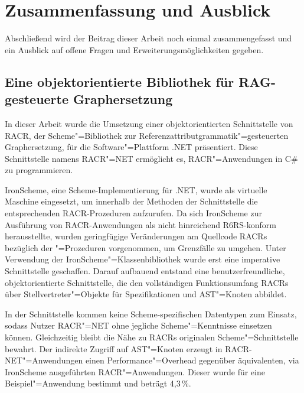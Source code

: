 

\chapter{Zusammenfassung und Ausblick}\label{ausblick}

Abschließend wird der Beitrag dieser Arbeit noch einmal zusammengefasst und ein Ausblick auf offene Fragen und Erweiterungsmöglichkeiten gegeben.

\section{Eine objektorientierte Bibliothek für RAG-gesteuerte Graphersetzung}

In dieser Arbeit wurde die Umsetzung einer objektorientierten Schnittstelle von RACR, der Scheme"=Bibliothek zur Referenzattributgrammatik"=gesteuerten Graphersetzung, für die Software"=Plattform .NET präsentiert. Diese Schnittstelle namens RACR"=NET ermöglicht es, RACR"=Anwendungen in C\# zu programmieren.

IronScheme, eine Scheme-Implementierung für .NET, wurde als virtuelle Maschine eingesetzt, um innerhalb der Methoden der Schnittstelle die entsprechenden RACR-Prozeduren aufzurufen. Da sich IronScheme zur Ausführung von RACR-Anwendungen als nicht hinreichend R6RS-konform herausstellte, wurden geringfügige Veränderungen am Quellcode RACRs bezüglich der "=Prozeduren vorgenommen, um Grenzfälle zu umgehen. Unter Verwendung der IronScheme"=Klassenbibliothek wurde erst eine imperative Schnittstelle geschaffen. Darauf aufbauend entstand eine benutzerfreundliche, objektorientierte Schnittstelle, die den vollständigen Funktionsumfang RACRs über Stellvertreter"=Objekte für Spezifikationen und AST"=Knoten abbildet.

In der Schnittstelle kommen keine Scheme-spezifischen Datentypen zum Einsatz, sodass Nutzer RACR"=NET ohne jegliche Scheme"=Kenntnisse einsetzen können. Gleichzeitig bleibt die Nähe zu RACRs originalen Scheme"=Schnittstelle bewahrt. Der indirekte Zugriff auf AST"=Knoten erzeugt in RACR-NET"=Anwendungen einen Performance"=Overhead gegenüber äquivalenten, via IronScheme ausgeführten RACR"=Anwendungen. Dieser wurde für eine Beispiel"=Anwendung bestimmt und beträgt 4,3\,\%.

